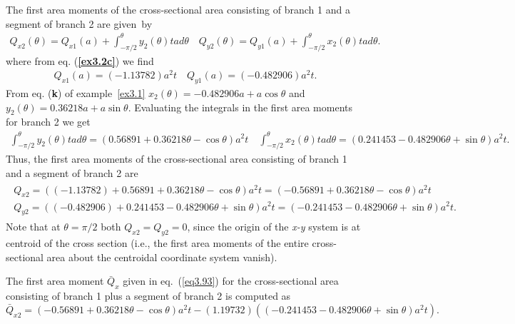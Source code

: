 \documentclass{AeroStructure-ERJohnson}
\begin{document}
\begin{example}
\vspace*{-10pt}

The first area moments of the cross-sectional area consisting of branch 1 and a segment of branch 2 are given~by
\begin{align}\label{ex3.2g}
Q_{x 2}(\theta)=Q_{x 1}(a)+\int_{-\pi / 2}^{\theta} y_{2}(\theta) \textit{tad} \theta \quad Q_{y 2}(\theta)=Q_{y 1}(a)+\int_{-\pi / 2}^{\theta} x_{2}(\theta) \textit{tad} \theta. \tag{g}
\end{align}
where from eq. (\textbf{\ref{ex3.2c}}) we find
\begin{align}\label{ex3.2h}
Q_{x 1}(a)=(-1.13782) a^{2} t \quad Q_{y 1}(a)=(-0.482906) a^{2} t. \tag{h}
\end{align}
From eq. (\textbf{k}) of example~\ref{ex3.1} $x_{2}(\theta)=-0.482906 a+a \cos \theta$ and $y_{2}(\theta)=0.36218 a+a \sin \theta$. Evaluating the integrals in the first area moments for branch 2 we get
\begin{align*}
\int_{-\pi / 2}^{\theta} y_{2}(\theta) \textit{tad} \theta=(0.56891+0.36218 \theta-\cos \theta) a^{2} t \quad \int_{-\pi / 2}^{\theta} x_{2}(\theta) t a d \theta=(0.241453-0.482906 \theta+\sin \theta) a^{2} t.
\end{align*}
Thus, the first area moments of the cross-sectional area consisting of branch 1 and a segment of branch 2 are
\begin{gather}\label{ex3.2i}
\begin{split}
Q_{x 2}=((-1.13782)+0.56891+0.36218 \theta-\cos \theta) a^{2} t=(-0.56891+0.36218 \theta-\cos \theta) a^{2} t \\
Q_{y 2}=((-0.482906)+0.241453-0.482906 \theta+\sin \theta) a^{2} t=(-0.241453-0.482906 \theta+\sin \theta) a^{2} t.
\end{split}\tag{i}
\end{gather}
Note that at $\theta=\pi / 2$ both $Q_{x 2}=Q_{y 2}=0$, since the origin of the \textit{x-y} system is at centroid of the cross section (i.e., the first area moments of the entire cross-sectional area about the centroidal coordinate system vanish).

The first area moment $\bar{Q}_{x}$ given in eq.~(\ref{eq3.93}) for the cross-sectional area consisting of branch 1 plus a segment of branch 2 is computed as
\[
\bar{Q}_{x 2}=(-0.56891+0.36218 \theta-\cos \theta) a^{2} t-(1.19732)((-0.241453-0.482906 \theta+\sin \theta) a^{2} t).
\]


\end{example}
\end{document}
